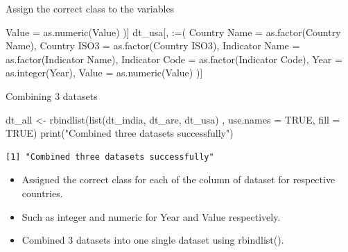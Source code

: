 \documentclass[
  8pt,
  ignorenonframetext,
]{beamer}
\newenvironment{Shaded}{\begin{snugshade}}{\end{snugshade}}
\newcommand{\AttributeTok}[1]{\textcolor[rgb]{0.40,0.45,0.13}{#1}}
\newcommand{\ConstantTok}[1]{\textcolor[rgb]{0.56,0.35,0.01}{#1}}
\newcommand{\FunctionTok}[1]{\textcolor[rgb]{0.28,0.35,0.67}{#1}}
\newcommand{\NormalTok}[1]{\textcolor[rgb]{0.00,0.23,0.31}{#1}}
\newcommand{\OtherTok}[1]{\textcolor[rgb]{0.00,0.23,0.31}{#1}}
\newcommand{\StringTok}[1]{\textcolor[rgb]{0.13,0.47,0.30}{#1}}
\providecommand{\tightlist}{%
  \setlength{\itemsep}{0pt}\setlength{\parskip}{0pt}}\usepackage{longtable,booktabs,array}
\begin{document}
\begin{frame}[fragile]{Assign the correct class to the variables}
\begin{Shaded}
\begin{Highlighting}[]
  \AttributeTok{Value =} \FunctionTok{as.numeric}\NormalTok{(Value)}
\NormalTok{)]}
\NormalTok{dt\_usa[, }\StringTok{\textasciigrave{}}\AttributeTok{:=}\StringTok{\textasciigrave{}}\NormalTok{(}
  \StringTok{\textasciigrave{}}\AttributeTok{Country Name}\StringTok{\textasciigrave{}} \OtherTok{=} \FunctionTok{as.factor}\NormalTok{(}\StringTok{\textasciigrave{}}\AttributeTok{Country Name}\StringTok{\textasciigrave{}}\NormalTok{),}
  \StringTok{\textasciigrave{}}\AttributeTok{Country ISO3}\StringTok{\textasciigrave{}} \OtherTok{=} \FunctionTok{as.factor}\NormalTok{(}\StringTok{\textasciigrave{}}\AttributeTok{Country ISO3}\StringTok{\textasciigrave{}}\NormalTok{),}
  \StringTok{\textasciigrave{}}\AttributeTok{Indicator Name}\StringTok{\textasciigrave{}} \OtherTok{=} \FunctionTok{as.factor}\NormalTok{(}\StringTok{\textasciigrave{}}\AttributeTok{Indicator Name}\StringTok{\textasciigrave{}}\NormalTok{),}
  \StringTok{\textasciigrave{}}\AttributeTok{Indicator Code}\StringTok{\textasciigrave{}} \OtherTok{=} \FunctionTok{as.factor}\NormalTok{(}\StringTok{\textasciigrave{}}\AttributeTok{Indicator Code}\StringTok{\textasciigrave{}}\NormalTok{),}
  \AttributeTok{Year =} \FunctionTok{as.integer}\NormalTok{(Year),}
  \AttributeTok{Value =} \FunctionTok{as.numeric}\NormalTok{(Value)}
\NormalTok{)]}
\end{Highlighting}
\end{Shaded}
\end{frame}

\begin{frame}[fragile]{Combining 3 datasets}
\label{combining-3-datasets}
\begin{Shaded}
\begin{Highlighting}[]
\NormalTok{dt\_all }\OtherTok{\textless{}{-}} \FunctionTok{rbindlist}\NormalTok{(}\FunctionTok{list}\NormalTok{(dt\_india, dt\_are, dt\_usa)}
\NormalTok{                    , }\AttributeTok{use.names =} \ConstantTok{TRUE}\NormalTok{, }\AttributeTok{fill =} \ConstantTok{TRUE}\NormalTok{)}
\FunctionTok{print}\NormalTok{(}\StringTok{"Combined three datasets successfully"}\NormalTok{)}
\end{Highlighting}
\end{Shaded}

\begin{verbatim}
[1] "Combined three datasets successfully"
\end{verbatim}

\begin{itemize}
\tightlist
\item
  Assigned the correct class for each of the column of dataset for
  respective countries.
\item
  Such as integer and numeric for Year and Value respectively.
\item
  Combined 3 datasets into one single dataset using rbindlist().
\end{itemize}
\end{frame}
\end{document}
